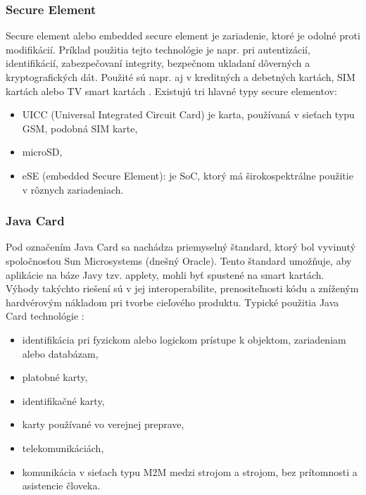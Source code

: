 \documentclass[12pt,a4paper,oneside,openright]{report}
\begin{document}
\subsubsection{Secure Element} \label{s_se}
Secure element alebo embedded secure element je zariadenie, ktoré je odolné proti modifikácií. Príklad použitia tejto technológie je napr. pri autentizácií, identifikácií, zabezpečovaní integrity, bezpečnom ukladaní dôverných a kryptografických dát. Použité sú napr. aj v kreditných a debetných kartách, SIM kartách alebo TV smart kartách \cite{gp}\cite{gemalto}.
Existujú tri hlavné typy secure elementov:
\begin{itemize}
	\item UICC (Universal Integrated Circuit Card) je karta, používaná v sieťach typu GSM, podobná SIM karte,
	\item microSD,
	\item eSE (embedded Secure Element): je SoC, ktorý má širokospektrálne použitie v rôznych zariadeniach.
\end{itemize}
\onehalfspacing

\subsubsection{Java Card} \label{s_jc}
Pod označením Java Card sa nachádza priemyselný štandard, ktorý bol vyvinutý  spoločnosťou Sun Microsystems (dnešný Oracle). Tento štandard umožňuje, aby aplikácie na báze Javy tzv. applety, mohli byť spustené na smart kartách. Výhody takýchto riešení sú v jej interoperabilite, prenositeľnosti kódu a zníženým hardvérovým nákladom pri tvorbe cieľového produktu.
Typické použitia Java Card technológie \cite{jcop}:
\begin{itemize}
	\item identifikácia pri fyzickom alebo logickom prístupe k objektom, zariadeniam alebo databázam,
	\item platobné karty,
	\item identifikačné karty,
	\item karty používané vo verejnej preprave,
	\item telekomunikáciách,
	\item komunikácia v sieťach typu M2M medzi strojom a strojom, bez prítomnosti a asistencie človeka.
\end{itemize}
\onehalfspacing
\end{document}
